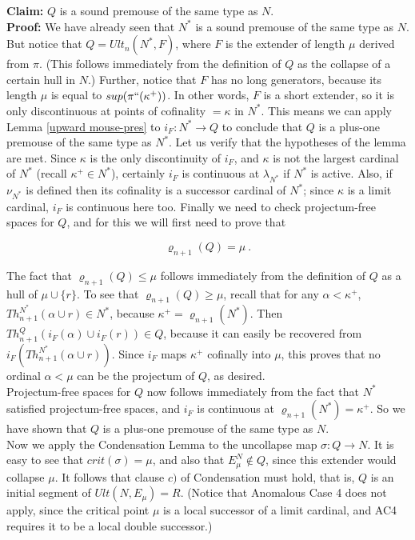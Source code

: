 \documentclass[12pt]{article}
\begin{document}
\textbf{Claim:} $Q$ is a sound premouse of the same type as $N$.\\

\textbf{Proof:}  We have already seen that $N^*$ is a sound premouse of the same type as $N$.  But notice that $Q = Ult_n (N^* , F)$, where $F$ is the extender of length $\mu$ derived from $\pi$.  (This follows immediately from the definition of $Q$ as the collapse of a certain hull in $N$.)  Further, notice that $F$ has no long generators, because its length $\mu$ is equal to $sup ( \pi`` (\kappa^+))$.  In other words, $F$ is a short extender, so it is only discontinuous at points of cofinality $= \kappa$ in $N^*$.  This means we can apply Lemma \ref{upward mouse-pres} to $i_F : N^* \longrightarrow Q$ to conclude that $Q$ is a plus-one premouse of the same type as $N^*$.  Let us verify that the hypotheses of the lemma are met.  Since $\kappa$ is the only discontinuity of $i_F$, and $\kappa$ is not the largest cardinal of $N^*$ (recall $\kappa^+ \in N^*$), certainly $i_F$ is continuous at $\lambda_{N^*}$ if $N^*$ is active.  Also, if $\nu_{N^*}$ is defined then its cofinality is a successor cardinal of $N^*$; since $\kappa$ is a limit cardinal, $i_F$ is continuous here too.  Finally we need to check projectum-free spaces for $Q$, and for this we will first need to prove that

\[
\varrho_{n+1} (Q) = \mu \ .
\]

The fact that $\varrho_{n+1} (Q) \leq \mu$ follows immediately from the definition of $Q$ as a hull of $\mu \cup \{ r \}$.  To see that $\varrho_{n+1} (Q) \geq \mu$, recall that for any $\alpha < \kappa^+$, $Th^{N^*}_{n+1} (\alpha \cup r ) \in N^*$, because $\kappa^+ = \varrho_{n+1} (N^*)$.  Then $Th^{Q}_{n+1} (i_F (\alpha ) \cup i_F(r) ) \in Q$, because it can easily be recovered from $i_F ( Th^{N^*}_{n+1} (\alpha \cup r ))$.  Since $i_F$ maps $\kappa^+$ cofinally into $\mu$, this proves that no ordinal $\alpha < \mu$ can be the projectum of $Q$, as desired.\\

Projectum-free spaces for $Q$ now follows immediately from the fact that $N^*$ satisfied projectum-free spaces, and $i_F$ is continuous at $\varrho_{n+1} (N^*) = \kappa^+$.  So we have shown that $Q$ is a plus-one premouse of the same type as $N$.\\

Now we apply the Condensation Lemma to the uncollapse map $\sigma : Q \longrightarrow N$.  It is easy to see that $crit(\sigma) = \mu$, and also that $E_\mu^N \notin Q$, since this extender would collapse $\mu$.  It follows that clause $c)$ of Condensation must hold, that is, $Q$ is an initial segment of $Ult ( N , E_\mu ) = R$.  (Notice that Anomalous Case 4 does not apply, since the critical point $\mu$ is a local successor of a limit cardinal, and AC4 requires it to be a local double successor.)\\
\end{document}

